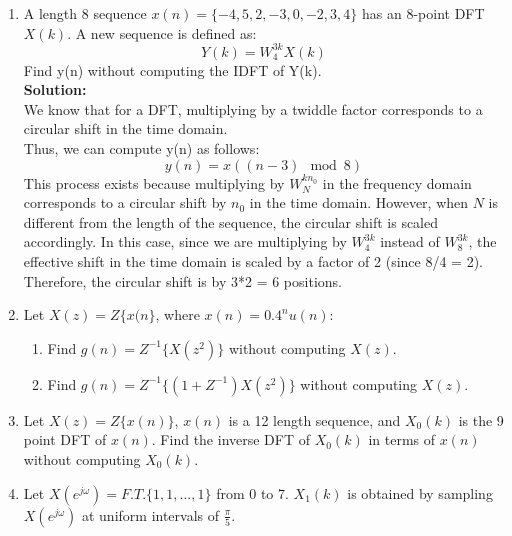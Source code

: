 \documentclass[12pt]{article}
\begin{document}
\begin{enumerate}
\begin{enumerate}
				Thus, we can compute $x(0)$ as follows:
			\item Find $x(7)$ without computing the IDFT of X(k). \\
				\textbf{Solution:} \\
				Using the property of DFT, we know that:
				\begin{equation}
					x(n) = \frac{1}{N} \sum_{k=0}^{N-1} X(k) e^{j\frac{2\pi}{N}kn}
				\end{equation}
				where N is the length of the sequence. \\
				Thus, we can compute $x(7)$ as follows:
		\end{enumerate}
		
	\item A length 8 sequence $x(n) = \{-4, 5, 2, -3, 0, -2, 3, 4\}$ has an 8-point DFT $X(k)$. A new sequence is defined as:
		\begin{equation}
			Y(k) = W_4^{3k} X(k)
		\end{equation}
		Find y(n) without computing the IDFT of Y(k). \\
		\textbf{Solution:} \\	
		We know that for a DFT, multiplying by a twiddle factor corresponds to a circular shift in the time domain. \\
		Thus, we can compute y(n) as follows:
		\begin{equation}
			y(n) = x((n-3) \mod 8)
		\end{equation}
		This process exists because multiplying by $W_N^{kn_0}$ in the frequency domain corresponds to a circular shift by $n_0$ in the time domain. However, when $N$ is different from the length of the sequence, the circular shift is scaled accordingly. In this case, since we are multiplying by $W_4^{3k}$ instead of $W_8^{3k}$, the effective shift in the time domain is scaled by a factor of 2 (since 8/4 = 2). Therefore, the circular shift is by 3*2 = 6 positions.

	\item Let $X(z) = Z\{x(n\}$, where $x(n) = 0.4^nu(n)$:
		\begin{enumerate}
			\item Find $g(n) = Z^{-1}\{X(z^2)\}$ without computing $X(z)$.
			\item Find $g(n) = Z^{-1}\{(1 + Z^{-1})X(z^2)\}$ without computing $X(z)$.
		\end{enumerate}
	\item Let $X(z) = Z\{x(n)\}$, $x(n)$ is a 12 length sequence, and $X_0(k)$ is the 9 point DFT of $x(n)$. Find the inverse DFT of $X_0(k)$ in terms of $x(n)$ without computing $X_0(k)$.
	\item Let $X(e^{j\omega}) = F.T.\{1, 1, ..., 1\}$ from 0 to 7. $X_1(k)$ is obtained by sampling $X(e^{j\omega})$ at uniform intervals of $\frac{\pi}{5}$. 
	\end{enumerate}
\end{document}
